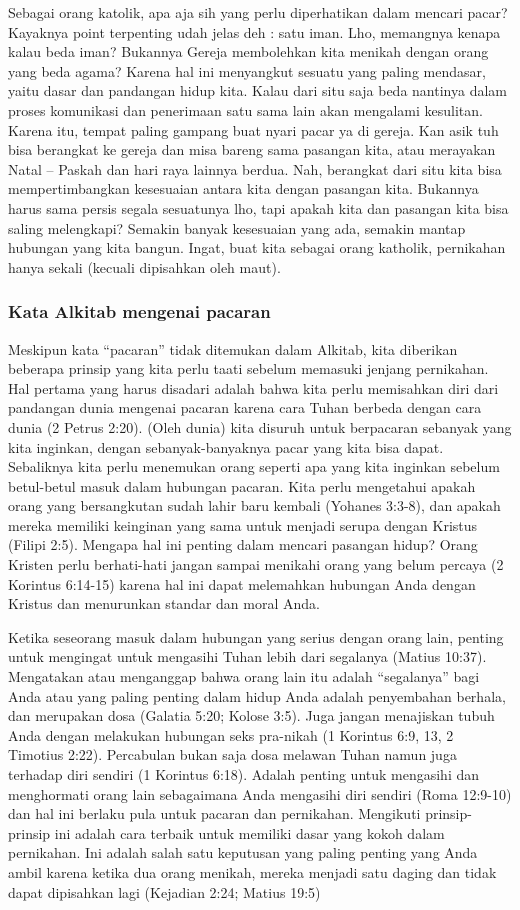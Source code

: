 \documentclass[11pt]{scrartcl}
\begin{document}
Sebagai orang katolik, apa aja sih yang perlu diperhatikan dalam mencari pacar? Kayaknya point terpenting udah jelas deh : satu iman. Lho, memangnya kenapa kalau beda iman? Bukannya Gereja membolehkan kita menikah dengan orang yang beda agama? Karena hal ini menyangkut sesuatu yang paling mendasar, yaitu dasar dan pandangan hidup kita. Kalau dari situ saja beda nantinya dalam proses komunikasi dan penerimaan satu sama lain akan mengalami kesulitan. Karena itu, tempat paling gampang buat nyari pacar ya di gereja. Kan asik tuh bisa berangkat ke gereja dan misa bareng sama pasangan kita, atau merayakan Natal – Paskah dan hari raya lainnya berdua. Nah, berangkat dari situ kita bisa mempertimbangkan kesesuaian antara kita dengan pasangan kita. Bukannya harus sama persis segala sesuatunya lho, tapi apakah kita dan pasangan kita bisa saling melengkapi? Semakin banyak kesesuaian yang ada, semakin mantap hubungan yang kita bangun. Ingat, buat kita sebagai orang katholik, pernikahan hanya sekali (kecuali dipisahkan oleh maut).

\subsubsection*{Kata Alkitab mengenai pacaran}
Meskipun kata “pacaran” tidak ditemukan dalam Alkitab, kita diberikan beberapa prinsip yang kita perlu taati sebelum memasuki jenjang pernikahan. Hal pertama yang harus disadari adalah bahwa kita perlu memisahkan diri dari pandangan dunia mengenai pacaran karena cara Tuhan berbeda dengan cara dunia (2 Petrus 2:20). (Oleh dunia) kita disuruh untuk berpacaran sebanyak yang kita inginkan, dengan sebanyak-banyaknya pacar yang kita bisa dapat. Sebaliknya kita perlu menemukan orang seperti apa yang kita inginkan sebelum betul-betul masuk dalam hubungan pacaran. Kita perlu mengetahui apakah orang yang bersangkutan sudah lahir baru kembali (Yohanes 3:3-8), dan apakah mereka memiliki keinginan yang sama untuk menjadi serupa dengan Kristus (Filipi 2:5). Mengapa hal ini penting dalam mencari pasangan hidup? Orang Kristen perlu berhati-hati jangan sampai menikahi orang yang belum percaya (2 Korintus 6:14-15) karena hal ini dapat melemahkan hubungan Anda dengan Kristus dan menurunkan standar dan moral Anda.

Ketika seseorang masuk dalam hubungan yang serius dengan orang lain, penting untuk mengingat untuk mengasihi Tuhan lebih dari segalanya (Matius 10:37). Mengatakan atau menganggap bahwa orang lain itu adalah “segalanya” bagi Anda atau yang paling penting dalam hidup Anda adalah penyembahan berhala, dan merupakan dosa (Galatia 5:20; Kolose 3:5). Juga jangan menajiskan tubuh Anda dengan melakukan hubungan seks pra-nikah (1 Korintus 6:9, 13, 2 Timotius 2:22). Percabulan bukan saja dosa melawan Tuhan namun juga terhadap diri sendiri (1 Korintus 6:18). Adalah penting untuk mengasihi dan menghormati orang lain sebagaimana Anda mengasihi diri sendiri (Roma 12:9-10) dan hal ini berlaku pula untuk pacaran dan pernikahan. Mengikuti prinsip-prinsip ini adalah cara terbaik untuk memiliki dasar yang kokoh dalam pernikahan. Ini adalah salah satu keputusan yang paling penting yang Anda ambil karena ketika dua orang menikah, mereka menjadi satu daging dan tidak dapat dipisahkan lagi (Kejadian 2:24; Matius 19:5)
\end{document}
